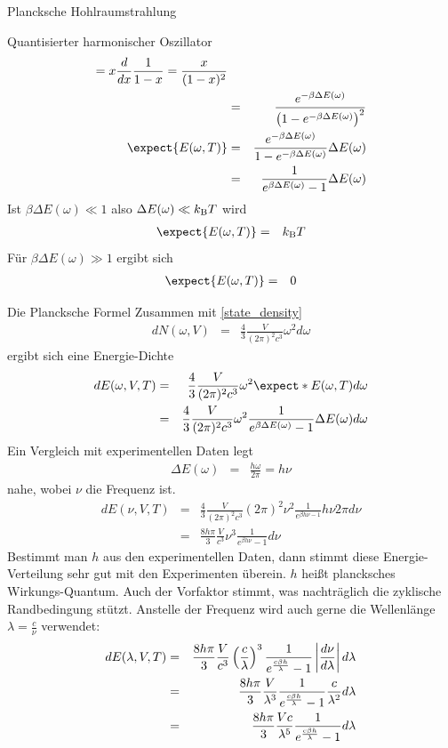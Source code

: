 \begin{chapter}{\titlestr}
\begin{section}{Plancksche Hohlraumstrahlung}
\begin{subsection}{Quantisierter harmonischer Oszillator}
\begin{eqnarray*}
=x\frac{d}{dx}\frac{1}{1-x}=\frac{x}{(1-x)^2}\\
&=&\frac{e^{-\beta \Delta E(\omega)}}{\left(1-e^{-\beta \Delta E(\omega)}\right)^2}\\
\expect{E(\omega,T)} &=& \frac{e^{-\beta \Delta E(\omega)}}{1-e^{-\beta \Delta E(\omega)}}\Delta E(\omega)\\
&=& \frac{1}{e^{\beta \Delta E(\omega)}-1}\Delta E(\omega)
\end{eqnarray*}
Ist $\beta \Delta E(\omega)\ll 1$ also $\Delta E(\omega)\ll k_{\mathrm{B}} T$ wird
\begin{eqnarray*}
\expect{E(\omega,T)} &=& \kb T
\end{eqnarray*}
Für $\beta \Delta E(\omega)\gg 1$ ergibt sich
\begin{eqnarray*}
\expect{E(\omega,T)} &=& 0
\end{eqnarray*}
\end{subsection}

\begin{subsection}{Die Plancksche Formel}
Zusammen mit \ref{state_density}
\begin{eqnarray*}
d N(\omega,V) &=& \frac{4}{3}\frac{V}{(2\pi)^2c^3} \omega^2 d\omega
\end{eqnarray*}
ergibt sich eine Energie-Dichte
\begin{eqnarray*}
d E(\omega,V,T) &=& \frac{4}{3}\frac{V}{(2\pi)^2c^3} \omega^2 \expect*{E(\omega,T)} d\omega\\
&=& \frac{4}{3}\frac{V}{(2\pi)^2c^3} \omega^2 \frac{1}{e^{\beta \Delta E(\omega)}-1}\Delta E(\omega) d\omega
\end{eqnarray*}
Ein Vergleich mit experimentellen Daten legt
\begin{eqnarray*}
\Delta E(\omega) &=& \frac{h\omega}{2\pi} = h\nu
\end{eqnarray*}
nahe, wobei $\nu$ die Frequenz ist.
\begin{eqnarray*}
d E(\nu,V,T) &=& \frac{4}{3}\frac{V}{(2\pi)^2c^3} (2\pi)^2\nu^2 \frac{1}{e^{\beta h\nu-1}}h\nu 2\pi d\nu\\
&=& \frac{8h\pi}{3}\frac{V}{c^3} \nu^3 \frac{1}{e^{\beta h\nu}-1}d\nu
\end{eqnarray*}
Bestimmt man $h$ aus den experimentellen Daten, dann stimmt diese Energie-Verteilung sehr gut mit den Experimenten überein.
$h$ heißt plancksches Wirkungs-Quantum. Auch der Vorfaktor stimmt, was nachträglich die zyklische Randbedingung stützt.
Anstelle der Frequenz wird auch gerne die Wellenlänge $\lambda=\frac{c}{\nu}$ verwendet:
\begin{eqnarray}
\label{lambda_density}
d E(\lambda,V,T) &=& \frac{8h\pi}{3}\frac{V}{c^3} \left(\frac{c}{\lambda}\right)^3 \frac{1}{e^{\frac{c\beta h}{\lambda}}-1}
\left|\frac{d\nu}{d\lambda}\right|d\lambda\cr
&=&\frac{8h\pi}{3}\frac{V}{\lambda^3} \frac{1}{e^{\frac{c\beta h}{\lambda}}-1}
\frac{c}{\lambda^2}d\lambda\cr
&=&\frac{8h\pi}{3}\frac{Vc}{\lambda^5} \frac{1}{e^{\frac{c\beta h}{\lambda}}-1}d\lambda
\end{eqnarray}
\end{subsection}


\end{section}
\end{chapter}
